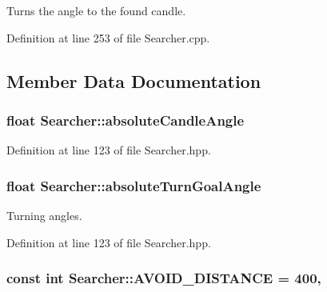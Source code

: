 Turns the angle to the found candle. 



Definition at line 253 of file Searcher.\-cpp.



\subsection{Member Data Documentation}
\hypertarget{classSearcher_a5a2d774c5f42091cbb584cfe944313d6}{
\subsubsection[{absolute\-Candle\-Angle}]{\setlength{\rightskip}{0pt plus 5cm}float Searcher\-::absolute\-Candle\-Angle\hspace{0.3cm}{\ttfamily [private]}}}\label{classSearcher_a5a2d774c5f42091cbb584cfe944313d6}


Definition at line 123 of file Searcher.\-hpp.

\hypertarget{classSearcher_aed8b034d6faa5556330af017c56f3a53}{
\subsubsection[{absolute\-Turn\-Goal\-Angle}]{\setlength{\rightskip}{0pt plus 5cm}float Searcher\-::absolute\-Turn\-Goal\-Angle\hspace{0.3cm}{\ttfamily [private]}}}\label{classSearcher_aed8b034d6faa5556330af017c56f3a53}


Turning angles. 



Definition at line 123 of file Searcher.\-hpp.

\hypertarget{classSearcher_ae0cc94f0e90c705ee21da7abf58fcc22}{
\subsubsection[{A\-V\-O\-I\-D\-\_\-\-D\-I\-S\-T\-A\-N\-C\-E}]{\setlength{\rightskip}{0pt plus 5cm}const int Searcher\-::\-A\-V\-O\-I\-D\-\_\-\-D\-I\-S\-T\-A\-N\-C\-E = 400\hspace{0.3cm}{\ttfamily [static]}, {\ttfamily [private]}}}\label{classSearcher_ae0cc94f0e90c705ee21da7abf58fcc22}



